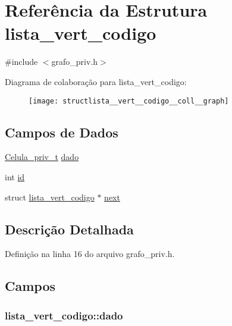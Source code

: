 \hypertarget{structlista__vert__codigo}{}\section{Referência da Estrutura lista\+\_\+vert\+\_\+codigo}
\label{structlista__vert__codigo}


{\ttfamily \#include $<$grafo\+\_\+priv.\+h$>$}



Diagrama de colaboração para lista\+\_\+vert\+\_\+codigo\+:\nopagebreak
\begin{figure}[H]
\begin{center}
\leavevmode
\texttt{[image: structlista\_\_vert\_\_codigo\_\_coll\_\_graph]}
\end{center}
\end{figure}
\subsection*{Campos de Dados}
\begin{DoxyCompactItemize}
\item 
\hyperlink{grafo_8h_ac2219b5d1f94e440b5895ce440ab23b9}{Celula\+\_\+priv\+\_\+t} \hyperlink{structlista__vert__codigo_a8e51b3141307b34cb74d6433a136f73b}{dado}
\item 
int \hyperlink{structlista__vert__codigo_acc7c3bce66ab242ba6e64e763dfb63b3}{id}
\item 
struct \hyperlink{structlista__vert__codigo}{lista\+\_\+vert\+\_\+codigo} $\ast$ \hyperlink{structlista__vert__codigo_af1cac7f22cb6142a13bd1f9c41f4c0b5}{next}
\end{DoxyCompactItemize}


\subsection{Descrição Detalhada}


Definição na linha 16 do arquivo grafo\+\_\+priv.\+h.



\subsection{Campos}
\hypertarget{structlista__vert__codigo_a8e51b3141307b34cb74d6433a136f73b}{}
\subsubsection[{dado}]{ lista\+\_\+vert\+\_\+codigo\+::dado}\label{structlista__vert__codigo_a8e51b3141307b34cb74d6433a136f73b}


